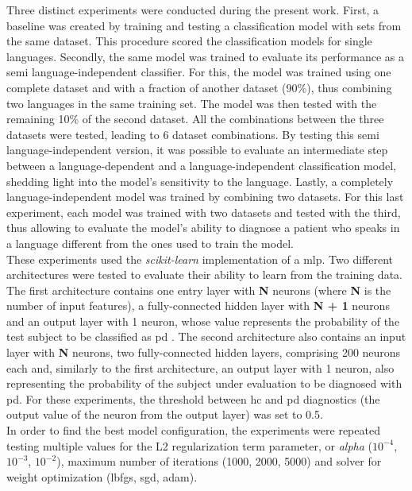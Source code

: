 Three distinct experiments were conducted during the present work. First, a baseline was created by training and testing a classification model with sets from the same dataset. This procedure scored the classification models for single languages. Secondly, the same model was trained to evaluate its performance as a semi language-independent classifier. For this, the model was trained using one complete dataset and with a fraction of another dataset (90\%), thus combining two languages in the same training set. The model was then tested with the remaining 10\% of the second dataset. All the combinations between the three datasets were tested, leading to 6 dataset combinations. By testing this semi language-independent version, it was possible to evaluate an intermediate step between a language-dependent and a language-independent classification model, shedding light into the model's sensitivity to the language. Lastly, a completely language-independent model was trained by combining two datasets. For this last experiment, each model was trained with two datasets and tested with the third, thus allowing to evaluate the model's ability to diagnose a patient who speaks in a language different from the ones used to train the model.
\\
These experiments used the \textit{scikit-learn} implementation \cite{scikit-learn} of a \gls{mlp}. Two different architectures were tested to evaluate their ability to learn from the training data. The first architecture contains one entry layer with \textbf{N} neurons (where \textbf{N} is the number of input features), a fully-connected hidden layer with \textbf{N + 1} neurons and an output layer with 1 neuron, whose value represents the probability of the test subject to be classified as \gls{pd} \cite{alzheimer_2014_1}. The second architecture also contains an input layer with \textbf{N} neurons, two fully-connected hidden layers, comprising 200 neurons each and, similarly to the first architecture, an output layer with 1 neuron, also representing the probability of the subject under evaluation to be diagnosed with \gls{pd}. For these experiments, the threshold between \gls{hc} and \gls{pd} diagnostics (the output value of the neuron from the output layer) was set to 0.5.
\\
In order to find the best model configuration, the experiments were repeated testing multiple values for the L2 regularization term parameter, or \textit{alpha} ($ 10^{-4} $, $ 10^{-3} $, $ 10 ^{-2} $), maximum number of iterations (1000, 2000, 5000) and solver for weight optimization (lbfgs, sgd, adam). 

